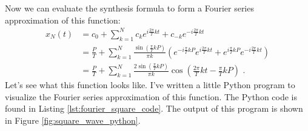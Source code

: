Now we can evaluate the synthesis formula to form a Fourier series approximation of this function:
\begin{align}
  x_N(t) & = c_0 + \sum_{k=1}^{N} c_k e^{i\frac{2\pi}{T}kt} + c_{-k} e^{-i\frac{2\pi}{T}kt}                                                                                                     \\
         & = \frac{P}{T} + \sum_{k=1}^{N} \frac{\sin\left(\frac{\pi}{T} kP\right)}{\pi k}  \left(e^{-i\frac{\pi}{T}kP}e^{i\frac{2\pi}{T}kt} + e^{i\frac{\pi}{T}kP}e^{-i\frac{2\pi}{T}kt}\right) \\
         & = \frac{P}{T} + \sum_{k=1}^{N} \frac{2\sin\left(\frac{\pi}{T} kP\right)}{\pi k} \cos\left( \frac{2\pi}{T}kt-\frac{\pi}{T}kP\right) \,\,.
\end{align}
Let's see what this function looks like. I've written a little Python
program to visualize the Fourier series approximation of this
function. The Python code is found in
Listing \ref{lst:fourier_square_code}. The output of this program is shown in Figure \ref{fig:square_wave_python}.



